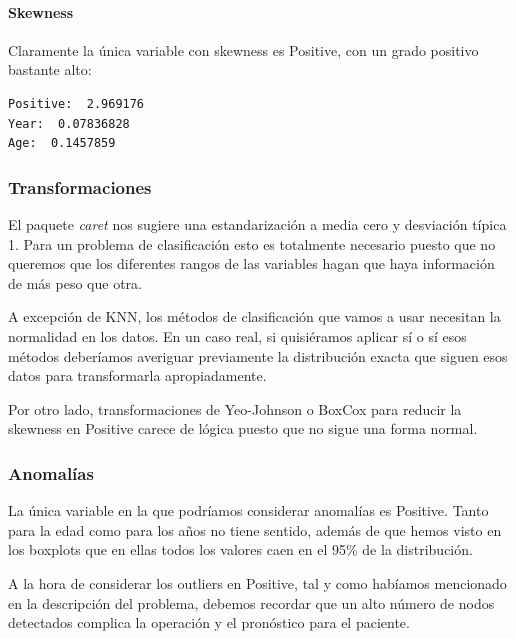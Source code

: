 \paragraph{Skewness}
Claramente la única variable con skewness es Positive, con un grado positivo bastante alto:
\begin{verbatim}
Positive:  2.969176
Year:  0.07836828
Age:  0.1457859
\end{verbatim}

\subsubsection{Transformaciones}

El paquete \textit{caret} nos sugiere una estandarización a media cero y desviación típica 1. Para un problema de clasificación esto es totalmente necesario puesto que no queremos que los diferentes rangos de las variables hagan que haya información de más peso que otra.

\vspace{\baselineskip}

A excepción de KNN, los métodos de clasificación que vamos a usar necesitan la normalidad en los datos. En un caso real, si quisiéramos aplicar sí o sí esos métodos deberíamos averiguar previamente la distribución exacta que siguen esos datos para transformarla apropiadamente. 

\vspace{\baselineskip}

Por otro lado, transformaciones de Yeo-Johnson o BoxCox para reducir la skewness en Positive carece de lógica puesto que no sigue una forma normal.

\subsubsection{Anomalías}

La única variable en la que podríamos considerar anomalías es Positive. Tanto para la edad como para los años no tiene sentido, además de que hemos visto en los boxplots que en ellas todos los valores caen en el 95\% de la distribución.

\vspace{\baselineskip}

A la hora de considerar los outliers en Positive, tal y como habíamos mencionado en la descripción del problema, debemos recordar que un alto número de nodos detectados complica la operación y el pronóstico para el paciente.

